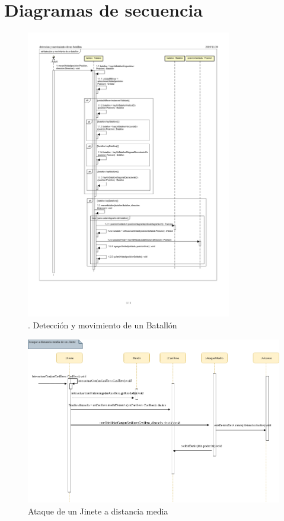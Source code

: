 \documentclass[titlepage,a4paper]{article}
\begin{document}
\section{Diagramas de secuencia}\label{sec:diagramasdesecuencia}


\begin{figure}[H]
\centering
\includegraphics[width=0.8\textwidth]{1- Deteccion y movimiento de un batallon.jpg}
\caption{\label{fig:seq01}. Detección y movimiento de un Batallón}
\end{figure}


\begin{figure}[H]
\centering
\includegraphics[width=\textwidth]{AtaqueJinete.png}
\caption{\label{fig:seq02}Ataque de un Jinete a distancia media}
\end{figure}
\end{document}
